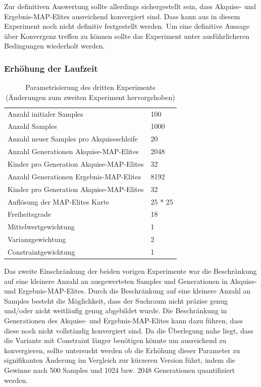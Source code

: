 
Zur definitiven Auswertung sollte allerdings sichergestellt sein, dass Akquise- und Ergebnis-MAP-Elites ausreichend konvergiert sind.
Dass kann aus in diesem Experiment noch nicht definitiv festgestellt werden.
Um eine definitive Aussage über Konvergenz treffen zu können sollte das Experiment unter ausführlicheren Bedingungen wiederholt werden.

\subsubsection{Erhöhung der Laufzeit}
\label{sub:exp3rd}
\begin{table}[h]
	\centering
	\begin{tabularx}{.75\textwidth}{ll}\hline
		Anzahl initialer Samples & 100 \\
		Anzahl Samples & 1000 \\
		Anzahl neuer Samples pro Akquiseschleife & 20 \\
		Anzahl Generationen Akquise-MAP-Elites & 2048 \\
		Kinder pro Generation Akquise-MAP-Elites & 32 \\
		Anzahl Generationen Ergebnis-MAP-Elites & 8192 \\
		Kinder pro Generation Akquise-MAP-Elites & 32 \\
		Auflösung der MAP-Elites Karte & 25 * 25  \\
		\hline
		Freiheitsgrade & 18 \\
		Mittelwertgewichtung & 1 \\
		Varianzgewichtung & 2 \\
		Constraintgewichtung & 1 \\
	\end{tabularx}
	\label{tab:params3rd}
	\caption{Parametrisierung des dritten Experiments (Änderungen zum zweiten Experiment hervorgehoben)}
\end{table}

Das zweite Einschränkung der beiden vorigen Experimente war die Beschränkung auf eine kleinere Anzahl an ausgewerteten Samples und Generationen in Akquise- und Ergebnis-MAP-Elites.
Durch die Beschränkung auf eine kleinere Anzahl an Samples besteht die Möglichkeit, dass der Suchraum nicht präzise genug und/oder nicht weitläufig genug abgebildet wurde.
Die Beschränkung in Generationen des Akquise- und Ergebnis-MAP-Elites kann dazu führen, dass diese noch nicht vollständig konvergiert sind.
Da die Überlegung nahe liegt, dass die Variante mit Constraint länger benötigen könnte um ausreichend zu konvergieren, sollte untersucht werden ob die Erhöhung dieser Parameter zu signifikanten Änderung im Vergleich zur kürzeren Version führt, indem die Gewinne nach 500 Samples und 1024 bzw. 2048 Generationen quantifiziert werden.

